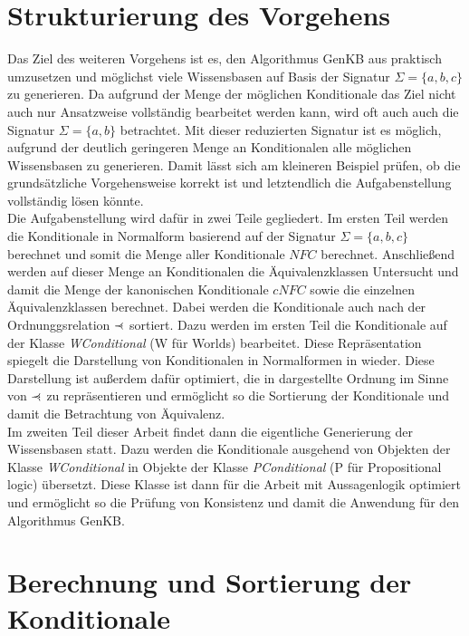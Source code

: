 \documentclass[12pt,a4paper]{article}
\newcommand\rdotl{\mathrel{%
    \mathchoice{\RQEQ}{\RQEQ}{\RQEQ}{\RQEQ}%
}}
\def\RQEQ{{%
    \setbox0\hbox{$\prec$}%
    \rlap{\hbox to \wd0{\hss \raisebox {0.01pt}{$\ \cdot$\hss}}}\box0
}}
\begin{document}
\section{Strukturierung des Vorgehens}
Das Ziel des weiteren Vorgehens ist es, den Algorithmus GenKB aus \cite{beierle19} praktisch umzusetzen und möglichst viele Wissensbasen auf Basis der Signatur $\Sigma=\{a,b,c\}$ zu generieren. Da aufgrund der Menge der möglichen Konditionale das Ziel nicht auch nur Ansatzweise vollständig bearbeitet werden kann, wird oft auch auch die Signatur $\Sigma=\{a,b\}$ betrachtet. Mit dieser reduzierten Signatur ist es möglich, aufgrund der deutlich geringeren Menge an Konditionalen alle möglichen Wissensbasen zu generieren. Damit lässt sich am kleineren Beispiel prüfen, ob die grundsätzliche Vorgehensweise korrekt ist und letztendlich die Aufgabenstellung vollständig lösen könnte. \\
Die Aufgabenstellung wird dafür in zwei Teile gegliedert. Im ersten Teil werden die Konditionale in Normalform basierend auf der Signatur $\Sigma=\{a,b,c\}$ berechnet und somit die Menge aller Konditionale $NFC$  berechnet. Anschließend werden auf dieser Menge an Konditionalen die Äquivalenzklassen Untersucht und damit die Menge der kanonischen Konditionale $cNFC$ sowie die einzelnen Äquivalenzklassen berechnet. Dabei werden die Konditionale auch nach der Ordnunggsrelation $\rdotl$ sortiert. Dazu werden im ersten Teil die Konditionale auf der Klasse \textit{WConditional} (W für Worlds) bearbeitet. Diese Repräsentation spiegelt die Darstellung von Konditionalen in Normalformen in \cite{beierle19} wieder. Diese Darstellung ist außerdem dafür optimiert, die in \cite{beierle19} dargestellte Ordnung im Sinne von $\rdotl$ zu repräsentieren und ermöglicht so die Sortierung der Konditionale und damit die Betrachtung von Äquivalenz. \\
Im zweiten Teil dieser Arbeit findet dann die eigentliche Generierung der Wissensbasen statt. Dazu werden die Konditionale ausgehend von Objekten der Klasse \textit{WConditional} in Objekte der Klasse \textit{PConditional} (P für Propositional logic) übersetzt. Diese Klasse ist dann für die Arbeit mit Aussagenlogik optimiert und ermöglicht so die Prüfung von Konsistenz und damit die Anwendung für den Algorithmus GenKB.




\section{Berechnung und Sortierung der Konditionale}
\end{document}
